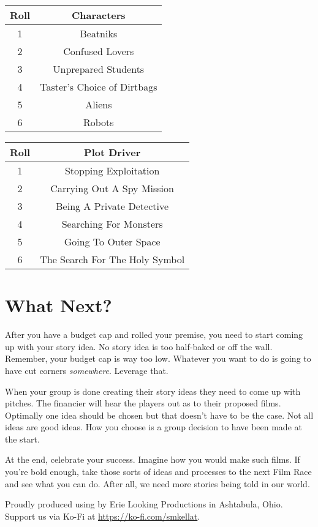 \documentclass[
notumble,
a5paper
]{leaflet}
\begin{document}
\begin{center}
\begin{tabular}{ |c|c| } 
 \hline
 Roll & Characters \\ 
 \hline
 1 & Beatniks \\
 \hline
 2 & Confused Lovers \\
 \hline
 3 & Unprepared Students \\
 \hline
 4 & Taster's Choice of Dirtbags \\
 \hline
 5 & Aliens \\
 \hline
 6 & Robots \\
 \hline
\end{tabular}
\end{center}

\begin{center}
\begin{tabular}{ |c|c| } 
 \hline
 Roll & Plot Driver \\ 
 \hline
 1 & Stopping Exploitation \\
 \hline
 2 & Carrying Out A Spy Mission \\
 \hline
 3 & Being A Private Detective \\
 \hline
 4 & Searching For Monsters \\
 \hline
 5 & Going To Outer Space \\
 \hline
 6 & The Search For The Holy Symbol \\
 \hline
\end{tabular}
\end{center}

\cleardoublepage

\section*{What Next?}

After you have a budget cap and rolled your premise, you need to start coming up with your story idea.  No story idea is too half-baked or off the wall.  Remember, your budget cap is way too low.  Whatever you want to do is going to have cut corners \emph{somewhere}.  Leverage that.

When your group is done creating their story ideas they need to come up with pitches.  The financier will hear the players out as to their proposed films.  Optimally one idea should be chosen but that doesn't have to be the case.  Not all ideas are good ideas.  How you choose is a group decision to have been made at the start.

At the end, celebrate your success.  Imagine how you would make such films.  If you're bold enough, take those sorts of ideas and processes to the next Film Race and see what you can do.  After all, we need more stories being told in our world.


\clearpage
\clearpage
\doclicenseThis

\begin{center}
Proudly produced using  by Erie Looking Productions in Ashtabula, Ohio.  Support us via Ko-Fi at \url{https://ko-fi.com/smkellat}.
\end{center}
\end{document}
